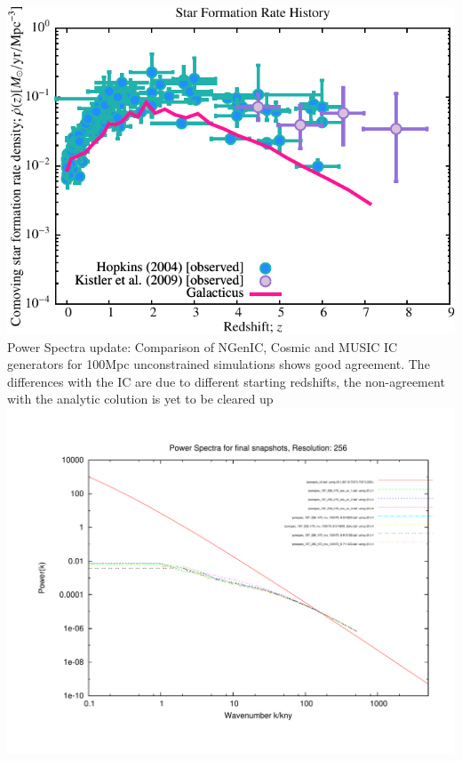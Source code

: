 \begin{itemize}
\includegraphics[scale=0.75]{r256/h70/nestages12_SL2/Plot_Star_Formation_History.pdf} \\
Power Spectra update: Comparison of NGenIC, Cosmic and MUSIC IC generators 
for 100Mpc unconstrained simulations shows good agreement. 
The differences with the IC are due to different starting redshifts, the 
non-agreement with the analytic colution is yet to be cleared up \\
\includegraphics[scale=0.45]{analysis/powerspectra/100MPcSimsComparison/fin_powspec_combined_256_h70.pdf} \\

\end{itemize}
